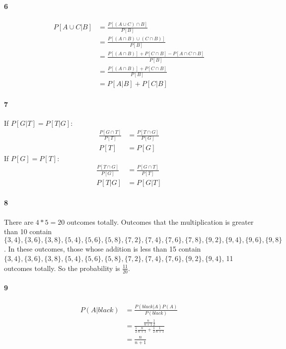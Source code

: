 \documentclass[22pt]{article}
\begin{document}
	\paragraph{6}
	 \begin{align}
	 	P[A \cup C|B] & = \frac{P[(A\cup C)\cap B]}{P[B]}\\
	 	& = \frac{P[(A\cap B)\cup (C\cap B)]}{P[B]}\\
	 	& = \frac{P[(A\cap B)]+P[C\cap B] - P[A\cap C\cap B]}{P[B]}\\\
	 	& = \frac{P[(A\cap B)]+P[C\cap B]}{P[B]}\\
	 	& = P[A|B] + P[C|B]
	 \end{align}
	\paragraph{7} If $P[G|T] = P[T|G]$:
	\begin{align}
		\frac{P[G\cap T]}{P[T]} & = \frac{P[T\cap G]}{P[G]} \\
		P[T] & = P[G]
	\end{align}
	If $P[G] = P[T]$:
	\begin{align}
		\frac{P[T\cap G]}{P[G]} & = \frac{P[G\cap T]}{P[T]} \\
		P[T|G] & = P[G|T]
	\end{align}

	\paragraph{8} There are $4*5=20$ outcomes totally. Outcomes that the multiplication is greater than 10 contain\\ $\{3,4\},\{3,6\},\{3,8\},\{5,4\},\{5,6\},\{5,8\},\{7,2\},\{7,4\},\{7,6\},\{7,8\},\{9,2\},\{9,4\},\{9,6\},\{9,8\}$. In these outcomes, those whose addition is less than 15 contain $\{3,4\},\{3,6\},\{3,8\},\{5,4\},\{5,6\},\{5,8\},\{7,2\},\{7,4\},\{7,6\},\{9,2\},\{9,4\}$, 11 outcomes totally. So the probability is $\frac{11}{20}$.

	\paragraph{9} \begin{align} 
	P(A|black) & = \frac{P(black|A)P(A)}{P(black)}\\
	& = \frac{\frac{n}{n+1}\frac{1}{2}}{\frac{1}{2}\frac{n}{n+1}+\frac{1}{2}\frac{1}{n+1}}\\
	& = \frac{n}{n+1}
	\end{align}
\end{document}

